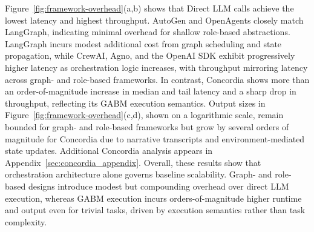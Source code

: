 Figure~\ref{fig:framework-overhead}(a,b) shows that Direct LLM calls achieve the lowest latency and highest throughput. AutoGen and OpenAgents closely match LangGraph, indicating minimal overhead for shallow role-based abstractions. LangGraph incurs modest additional cost from graph scheduling and state propagation, while CrewAI, Agno, and the OpenAI SDK exhibit progressively higher latency as orchestration logic increases, with throughput mirroring latency across graph- and role-based frameworks. In contrast, Concordia shows more than an order-of-magnitude increase in median and tail latency and a sharp drop in throughput, reflecting its GABM execution semantics. Output sizes in Figure~\ref{fig:framework-overhead}(c,d), shown on a logarithmic scale, remain bounded for graph- and role-based frameworks but grow by several orders of magnitude for Concordia due to narrative transcripts and environment-mediated state updates. Additional Concordia analysis appears in Appendix~\ref{sec:concordia_appendix}. 
%
Overall, these results show that orchestration architecture alone governs baseline scalability. Graph- and role-based designs introduce modest but compounding overhead over direct LLM execution, whereas GABM execution incurs orders-of-magnitude higher runtime and output even for trivial tasks, driven by execution semantics rather than task complexity.











